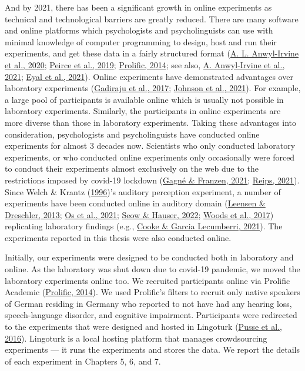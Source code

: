\documentclass[a4paper, nobind]{templates/ociamthesis}
\begin{document}
And by 2021, there has been a significant growth in online experiments as technical and technological barriers are greatly reduced.
There are many software and online platforms which psychologists and psycholinguists can use with minimal knowledge of computer programming
to design, host and run their experiments, and get these data in a fairly structured format (\protect\hyperlink{ref-Anwylirvine2020}{A. L. Anwyl-Irvine et al., 2020}; \protect\hyperlink{ref-Peirce2019}{Peirce et al., 2019}; \protect\hyperlink{ref-Prolific}{Prolific, 2014}; see also, \protect\hyperlink{ref-Anwylirvine2021}{A. Anwyl-Irvine et al., 2021}; \protect\hyperlink{ref-Eyal2021}{Eyal et al., 2021}).
Online experiments have demonstrated advantages over laboratory experiments (\protect\hyperlink{ref-Gadiraju2017}{Gadiraju et al., 2017}; \protect\hyperlink{ref-Johnson2021}{Johnson et al., 2021}).
For example, a large pool of participants is available online which is usually not possible in laboratory experiments.
Similarly, the participants in online experiments are more diverse than those in laboratory experiments.
Taking these advantages into consideration, psychologists and psycholinguists have conducted online experiments for almost 3 decades now.
Scientists who only conducted laboratory experiments, or who conducted online experiments only occasionally were forced to conduct their experiments almost exclusively on the web due to the restrictions imposed by covid-19 lockdown (\protect\hyperlink{ref-Gagne2021}{Gagné \& Franzen, 2021}; \protect\hyperlink{ref-Reips2021}{Reips, 2021}).
Since Welch \& Krantz (\protect\hyperlink{ref-Welch1996}{1996})'s auditory perception experiment, a number of experiments have been conducted online in auditory domain (\protect\hyperlink{ref-Leensen2013}{Leensen \& Dreschler, 2013}; \protect\hyperlink{ref-vanOs2021}{Os et al., 2021}; \protect\hyperlink{ref-Seow2022}{Seow \& Hauser, 2022}; \protect\hyperlink{ref-Woods2017}{Woods et al., 2017}) replicating laboratory findings (e.g., \protect\hyperlink{ref-Cooke2021}{Cooke \& Garcia Lecumberri, 2021}).
The experiments reported in this thesis were also conducted online.

Initially, our experiments were designed to be conducted both in laboratory and online.
As the laboratory was shut down due to covid-19 pandemic, we moved the laboratory experiments online too.
We recruited participants online via Prolific Academic (\protect\hyperlink{ref-Prolific}{Prolific, 2014}).
We used Prolific's filters to recruit only native speakers of German residing in Germany
who reported to not have had any hearing loss, speech-language disorder, and cognitive impairment.
Participants were redirected to the experiments that were designed and hosted in Lingoturk (\protect\hyperlink{ref-Pusse2016}{Pusse et al., 2016}).
Lingoturk is a local hosting platform that manages crowdsourcing experiments --- it runs the experiments and stores the data.
We report the details of each experiment in Chapters 5, 6, and 7.
\end{document}
